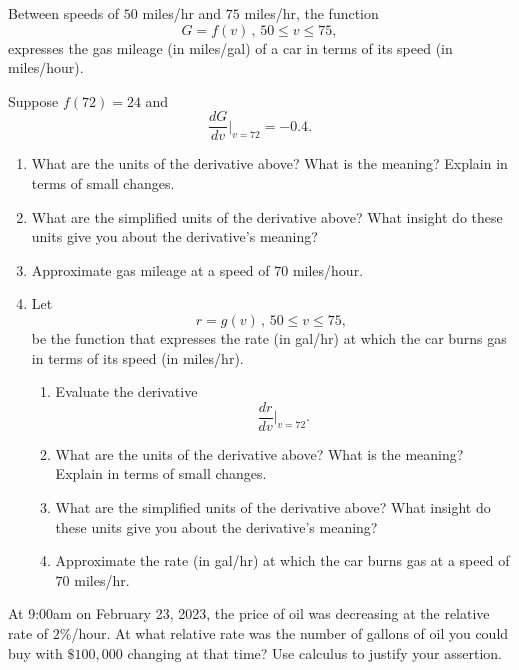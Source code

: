 \documentclass{ximera}
\begin{document}
\begin{exercise}  \label{Qdfbv4trttg}
Between speeds of $50$ miles/hr and $75$ miles/hr, the function
\[
    G = f(v) \, , \, 50 \leq v \leq 75,
\]
expresses the gas mileage (in miles/gal) of a car in terms of its speed (in miles/hour).

Suppose $f(72)=24$ and 
\[
  \frac{dG}{dv}\Big|_{v=72} = -0.4 .
\]

\begin{enumerate}
\item What are the units of the derivative above? What is the meaning? Explain in terms of small changes.

\item What are the simplified units of the derivative above? What insight do these units give you about the derivative's meaning?

\item Approximate gas mileage at a speed of $70$ miles/hour.

\item Let 
\[
  r=g(v) \, , \, 50 \leq v \leq 75,
\]
be the function that expresses the rate (in gal/hr) at which the car burns gas in terms of its speed (in miles/hr).

\begin{enumerate}  \label{EE5tghvdfsffd}
\item Evaluate the derivative
\[
  \frac{dr}{dv}\Big|_{v=72} .
\]

\item What are the units of the derivative above? What is the meaning? Explain in terms of small changes.

\item What are the simplified units of the derivative above? What insight do these units give you about the derivative's meaning?

\item Approximate the rate (in gal/hr) at which the car burns gas at a speed of $70$ miles/hr.

\end{enumerate}

\end{enumerate}

\end{exercise}


\begin{exercise}  \label{EEdfbygyhnnjjhh}
At 9:00am on February 23, 2023, the price of oil was decreasing at the relative rate of $2\%$/hour. At what relative rate was the number of gallons of oil you could buy with $\$100,000$ changing at that time? Use calculus to justify your assertion. 
\end{exercise}
\end{document}
